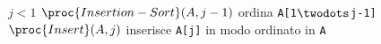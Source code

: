 \begin{codebox}
\li \If $j < 1$
\li     \Then
		$\proc{Insertion-Sort}(A,j-1)$
        \Comment ordina \texttt{A[1$\twodots$j-1]}
\li         $\proc{Insert}(A,j)$
        \Comment inserisce \texttt{A[j]} in modo ordinato in \texttt{A}
        \End
\end{codebox}